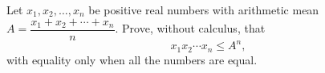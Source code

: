 Let $x_1,x_2,\dots,x_n$ be positive real numbers with arithmetic mean $A=\dfrac{x_1+x_2+\cdots+x_n}{n}$. Prove, without calculus, that
\[
x_1x_2\cdots x_n\le A^n ,
\]
with equality only when all the numbers are equal.
